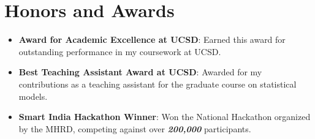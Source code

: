 \documentclass[a4paper,20pt]{article}
\newcommand{\resumeItem}[2]{
  \item\small{
    \textbf{#1}{: #2 \vspace{-2pt}}
  }
}
\newcommand{\resumeSubItem}[2]{\resumeItem{#1}{#2}\vspace{-3pt}}
\newcommand{\resumeSubHeadingListStart}{\begin{itemize}[leftmargin=*]}
\newcommand{\resumeSubHeadingListEnd}{\end{itemize}}
\begin{document}
\section{Honors and Awards}
\resumeSubHeadingListStart

\resumeSubItem{Award for Academic Excellence at UCSD}{Earned this award for outstanding performance in my coursework at UCSD.}
\vspace{2pt}
\resumeSubItem{Best Teaching Assistant Award at UCSD}{Awarded for my contributions as a teaching assistant for the graduate course on statistical models.}
\vspace{2pt}
\resumeSubItem{Smart India Hackathon Winner}{Won the National Hackathon organized by the MHRD, competing against over \textbf{\textit{200,000}} participants.}
\vspace{2pt}

\resumeSubHeadingListEnd

\vspace{-5pt}
\end{document}

